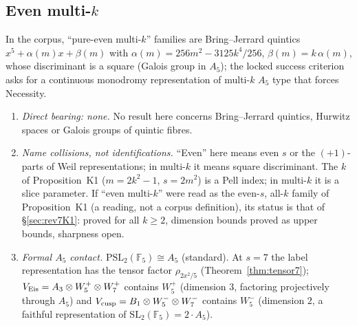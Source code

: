 \subsection{Even multi-$k$}\label{sec:rev8multik}
In the corpus, ``pure-even multi-$k$'' families are Bring--Jerrard quintics $x^5+\alpha(m)x+\beta(m)$ with $\alpha(m)=256m^2-3125k^4/256$, $\beta(m)=k\,\alpha(m)$, whose discriminant is a square (Galois group in $A_5$); the locked success criterion asks for a continuous monodromy representation of multi-$k$ $A_5$ type that forces Necessity.
\begin{enumerate}[label=(\alph*),leftmargin=2em]
\item \emph{Direct bearing: none.} No result here concerns Bring--Jerrard quintics, Hurwitz spaces or Galois groups of quintic fibres.
\item \emph{Name collisions, not identifications.} ``Even'' here means even $s$ or the $(+1)$-parts of Weil representations; in multi-$k$ it means square discriminant. The $k$ of Proposition~K1 ($m=2k^2-1$, $s=2m^2$) is a Pell index; in multi-$k$ it is a slice parameter. If ``even multi-$k$'' were read as the even-$s$, all-$k$ family of Proposition~K1 (a reading, not a corpus definition), its status is that of \S\ref{sec:rev7K1}: proved for all $k\ge2$, dimension bounds proved as upper bounds, sharpness open.
\item \emph{Formal $A_5$ contact.} $\mathrm{PSL}_2(\mathbb F_5)\cong A_5$ (standard). At $s=7$ the label representation has the tensor factor $\rho_{2x^2/5}$ (Theorem~\ref{thm:tensor7}); $V_{\rm Eis}=A_3\otimes W_5^+\otimes W_7^+$ contains $W_5^+$ (dimension $3$, factoring projectively through $A_5$) and $V_{\rm cusp}=B_1\otimes W_5^-\otimes W_7^-$ contains $W_5^-$ (dimension $2$, a faithful representation of $\mathrm{SL}_2(\mathbb F_5)=2\cdot A_5$).
\end{enumerate}
